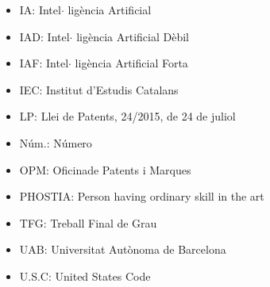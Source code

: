 \documentclass[12pt]{article}
\renewcommand{\_}{\kern-1.5pt\textunderscore\kern-1.5pt}
\begin{document}
\vspace{\baselineskip}
\begin{itemize}
	\item IA: Intel$ \cdot $ ligència Artificial\par


\vspace{\baselineskip}
	\item IAD: Intel$ \cdot $ ligència Artificial Dèbil\par


\vspace{\baselineskip}
	\item IAF: Intel$ \cdot $ ligència Artificial Forta\par


\vspace{\baselineskip}

\vspace{\baselineskip}

\vspace{\baselineskip}
	\item IEC: Institut d’Estudis Catalans\par


\vspace{\baselineskip}
	\item LP: Llei de Patents, 24/2015, de 24 de juliol\par


\vspace{\baselineskip}
	\item Núm.: Número\par


\vspace{\baselineskip}
	\item OPM: Oficinade Patents i Marques\par


\vspace{\baselineskip}
	\item PHOSTIA: Person having ordinary skill in the art\par


\vspace{\baselineskip}
	\item TFG: Treball Final de Grau\par


\vspace{\baselineskip}
	\item UAB: Universitat Autònoma de Barcelona\par


\vspace{\baselineskip}
	\item U.S.C: United States Code\par



\end{itemize}
\end{document}
